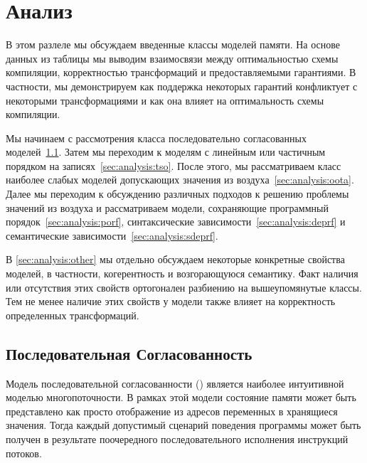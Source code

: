 \section{Анализ}
\label{sec:analysis}


В этом разлеле мы обсуждаем введенные классы моделей памяти.
На основе данных из таблицы 
мы выводим взаимосвязи между оптимальностью схемы компиляции,
корректностью трансформаций и предоставляемыми гарантиями. 
В частности, мы демонстрируем как поддержка 
некоторых гарантий конфликтует с некоторыми трансформациями 
и как она влияет на оптимальность схемы компиляции. 

Мы начинаем с рассмотрения класса 
последовательно согласованных моделей~\cref{sec:analysis:seqcst}.
Затем мы переходим к моделям с линейным или 
частичным порядком на записях~\cref{sec:analysis:tso}.
После этого, мы рассматриваем класс наиболее слабых моделей 
допускающих значения из воздуха~\cref{sec:analysis:oota}.
Далее мы переходим к обсуждению различных подходов 
к решению проблемы значений из воздуха и рассматриваем модели, 
сохраняющие программный порядок~\cref{sec:analysis:porf},
синтаксические зависимости~\cref{sec:analysis:deprf} и
семантические зависимости~\cref{sec:analysis:sdeprf}.
 
В \cref{sec:analysis:other} мы отдельно обсуждаем некоторые 
конкретные свойства моделей, в частности, когерентность и возгорающуюся семантику. 
Факт наличия или отсутствия этих свойств ортогонален
разбиению на вышеупомянутые классы. 
Тем не менее наличие этих свойств у модели также влияет 
на корректность определенных трансформаций.

\subsection{Последовательная Согласованность}
\label{sec:analysis:seqcst}

Модель последовательной согласованности (\SC)
является наиболее интуитивной моделью многопоточности.
В рамках этой модели состояние памяти может быть 
представлено как просто отображение из 
адресов переменных в хранящиеся значения. 
Тогда каждый допустимый сценарий поведения программы 
может быть получен в результате поочередного последовательного
исполнения инструкций потоков. 

